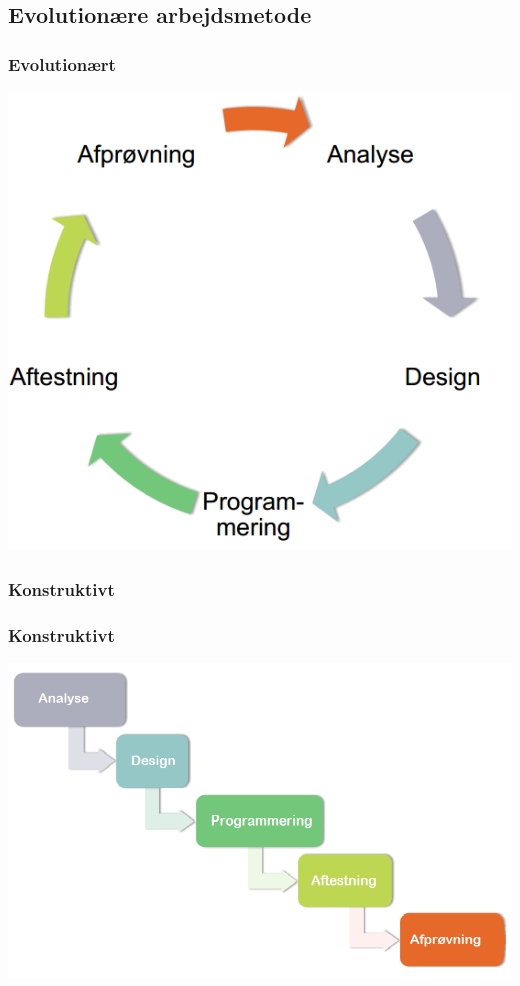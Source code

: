 \subsection{Evolutionære arbejdsmetode}
\begin{frame}
	\frametitle{Evolutionært}
	\begin{center}
	\includegraphics[scale=0.35]{../report/billeder/evolutionaeremetode.png}
	\end{center}
\end{frame}

\subsubsection{Konstruktivt}
\begin{frame}
	\frametitle{Konstruktivt}
	\begin{center}
	\includegraphics[scale=0.35]{../report/billeder/konstruktivemetode.png}
	\end{center}
	
\end{frame}

